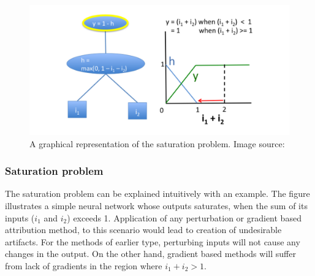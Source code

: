 \documentclass[../report.tex]{subfiles}
\begin{document}
 \begin{figure}[h]
 	\includegraphics[width=\textwidth]{images/chapter3/deep_lift.png}
 	\caption{A graphical representation of the saturation problem. Image source: \cite{shrikumar2017learning}}
 	\label{fig_deep_lift}
 \end{figure}
 \subsubsection{Saturation problem}\label{sec_saturation}
 The saturation problem can be explained intuitively with an example. The figure illustrates a simple neural network whose outputs saturates, when the sum of its inputs ($i_1$ and $i_2$) exceeds 1. Application of any perturbation or gradient based attribution method, to this scenario would lead to creation of undesirable artifacts. For the methods of earlier type, perturbing inputs will not cause any changes in the output. On the other hand, gradient based methods will suffer from lack of gradients in the region where $i_1+i_2 > 1$.
\end{document}
